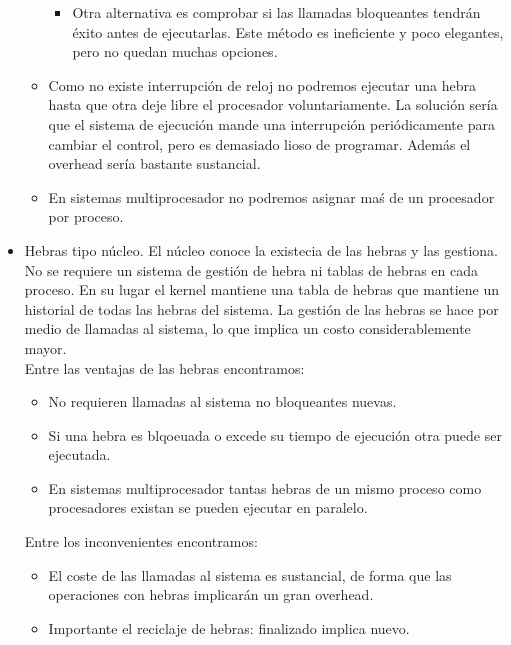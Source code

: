 \documentclass{article}
\begin{document}
\begin{itemize}
\begin{itemize}
\begin{itemize}
		\item Otra alternativa es comprobar si las llamadas bloqueantes tendrán éxito antes de ejecutarlas. Este método es ineficiente y poco elegantes, pero no quedan muchas opciones.
		\end{itemize}
	
	\item Como no existe interrupción de reloj no podremos ejecutar una hebra hasta que otra deje libre el procesador voluntariamente. La solución sería que el sistema de ejecución mande una interrupción periódicamente para cambiar el control, pero es demasiado lioso de programar. Además el overhead sería bastante sustancial.
	
	\item En sistemas multiprocesador no podremos asignar maś de un procesador por proceso.
	\end{itemize}

\item Hebras tipo núcleo. El núcleo conoce la existecia de las hebras y las gestiona. No se requiere un sistema de gestión de hebra ni tablas de hebras en cada proceso. En su lugar el kernel mantiene una tabla de hebras que mantiene un historial de todas las hebras del sistema. La gestión de las hebras se hace por medio de llamadas al sistema, lo que implica un costo considerablemente mayor.\\

Entre las ventajas de las hebras encontramos:
	\begin{itemize}
	\item No requieren llamadas al sistema no bloqueantes nuevas. 
	
	\item Si una hebra es blqoeuada o excede su tiempo de ejecución otra puede ser ejecutada.
	
	\item En sistemas multiprocesador tantas hebras de un mismo proceso como procesadores existan se pueden ejecutar en paralelo.
	\end{itemize}
	
Entre los inconvenientes encontramos:
	\begin{itemize}
	\item El coste de las llamadas al sistema es sustancial, de forma que las operaciones con hebras implicarán un gran overhead.
	
	\item Importante el reciclaje de hebras: finalizado implica nuevo.
	\end{itemize}


\end{itemize}
\end{document}
